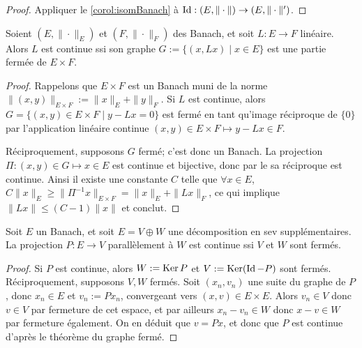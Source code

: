 \begin{proof}
	Appliquer le \cref{corol:isomBanach} à $\operatorname{Id} : (E,\|\cdot\|) \to (E,\|\cdot\|')$.
\end{proof}


\begin{theorem}
\label{th:grapheFerme}
%
	Soient $(E,\|\cdot\|_E)$ et $(F,\|\cdot\|_F)$ des Banach, et soit $L : E \to F$ linéaire. Alors $L$ est continue ssi son graphe $G := \{ (x,Lx) \mid x \in E\}$ est une partie fermée de $E \times F$. 
\end{theorem}

\begin{proof}
Rappelons que $E \times F$ est un Banach muni de la norme $\|(x,y)\|_{E \times F} := \|x\|_E+\|y\|_F$.
Si $L$ est continue, alors $G = \{ (x,y) \in E \times F	\mid y - Lx = 0\}$ est fermé en tant qu'image réciproque de $\{0\}$ par l'application linéaire continue $(x,y)\in E \times F \mapsto y-Lx \in F$. 


Réciproquement, supposons $G$ fermé; c'est donc un Banach. La projection $\Pi : (x,y) \in G \mapsto x \in E$ est continue et bijective, donc par le  sa réciproque est  continue. Ainsi il existe une constante $C$ telle que $\forall x \in E$, $C \|x\|_E \geq \|\Pi^{-1} x\|_{E \times F} = \|x\|_E + \|Lx \|_F$, ce qui implique $\|Lx\| \leq (C-1)\|x\|$ et conclut.
\end{proof}

\begin{corollary}
	Soit $E$ un Banach, et soit $E = V\oplus W$ une décomposition en sev supplémentaires. La projection $P : E\to V$ parallèlement à $W$ est continue ssi $V$ et $W$ sont fermés.
\end{corollary}

\begin{proof}
	Si $P$ est continue, alors $W := \operatorname{Ker} P$ et $V := \operatorname{Ker} (\operatorname{Id}-P)$ sont fermés. Réciproquement, supposons $V,W$ fermés.
	Soit $(x_n,v_n)$ une suite du graphe de $P$, donc $x_n \in E$ et $v_n := P x_n$, convergeant vers $(x,v)\in E\times E$. Alors $v_n \in V$ donc $v\in V$ par fermeture de cet espace, et par ailleurs $x_n-v_n \in W$ donc $x-v\in W$ par fermeture également. On en déduit que $v=P x$, et donc que $P$ est continue d'après le théorème du graphe fermé.
\end{proof}
